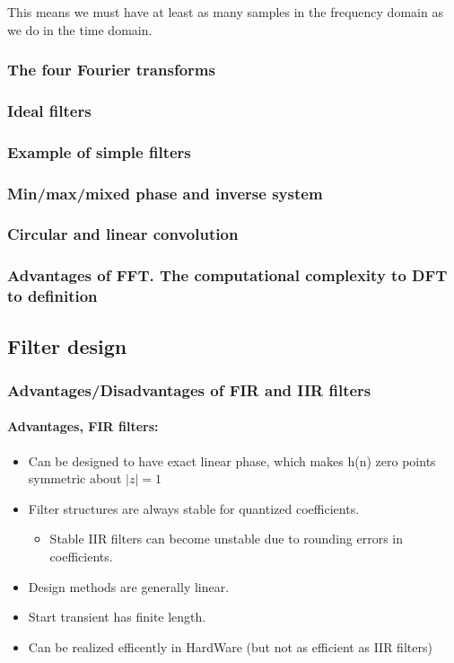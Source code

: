 \documentclass{article}
\begin{document}
This means we must have at least as many samples in the frequency domain as we do in the time domain.
\subsubsection{The four Fourier transforms}

\subsubsection{Ideal filters}
\subsubsection{Example of simple filters}
\subsubsection{Min/max/mixed phase and inverse system}
\subsubsection{Circular and linear convolution}
\subsubsection{Advantages of FFT. The computational complexity to DFT to definition}

\subsection{Filter design}

\subsubsection{Advantages/Disadvantages of FIR and IIR filters}
\paragraph{Advantages, FIR filters:}
\begin{itemize}
    \item Can be designed to have exact linear phase, which makes h(n) zero points symmetric about $|z| = 1$
    \item  Filter structures are always stable for quantized coefficients.
    \begin{itemize}
        \item Stable IIR filters can become unstable due to rounding errors in coefficients.
    \end{itemize}
    \item Design methods are generally linear. 
    \item Start transient has finite length.
    \item Can be realized efficently in HardWare (but not as efficient as IIR filters)
\end{itemize}
\end{document}

